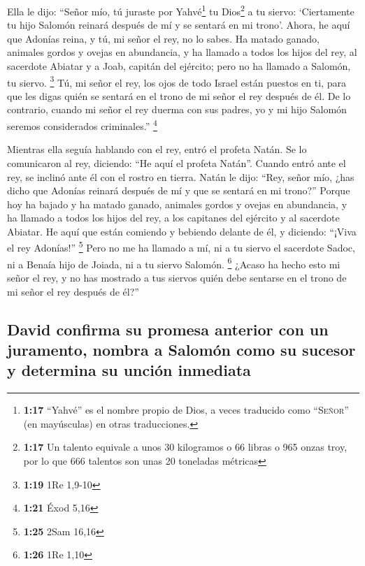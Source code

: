 \begin{paracol}{2}
 Ella le dijo: ``Señor mío, tú juraste por
Yahvé\footnote{\textbf{1:17} ``Yahvé'' es el nombre propio de Dios, a
  veces traducido como ``\textsc{Señor}'' (en mayúsculas) en otras
  traducciones.} tu Dios\footnote{\textbf{1:17} Un talento equivale a
  unos 30 kilogramos o 66 libras o 965 onzas troy, por lo que 666
  talentos son unas 20 toneladas métricas} a tu siervo: `Ciertamente tu
hijo Salomón reinará después de mí y se sentará en mi trono'.
 Ahora, he aquí que Adonías reina, y tú, mi señor el rey,
no lo sabes.  Ha matado ganado, animales gordos y ovejas
en abundancia, y ha llamado a todos los hijos del rey, al sacerdote
Abiatar y a Joab, capitán del ejército; pero no ha llamado a Salomón, tu
siervo. \footnote{\textbf{1:19} 1Re 1,9-10}  Tú, mi señor
el rey, los ojos de todo Israel están puestos en ti, para que les digas
quién se sentará en el trono de mi señor el rey después de él.
 De lo contrario, cuando mi señor el rey duerma con sus
padres, yo y mi hijo Salomón seremos considerados criminales.''
\footnote{\textbf{1:21} Éxod 5,16}

 Mientras ella seguía hablando con el rey, entró el
profeta Natán.  Se lo comunicaron al rey, diciendo: ``He
aquí el profeta Natán''. Cuando entró ante el rey, se inclinó ante él
con el rostro en tierra.  Natán le dijo: ``Rey, señor
mío, ¿has dicho que Adonías reinará después de mí y que se sentará en mi
trono?''  Porque hoy ha bajado y ha matado ganado,
animales gordos y ovejas en abundancia, y ha llamado a todos los hijos
del rey, a los capitanes del ejército y al sacerdote Abiatar. He aquí
que están comiendo y bebiendo delante de él, y diciendo: ``¡Viva el rey
Adonías!'' \footnote{\textbf{1:25} 2Sam 16,16}  Pero no
me ha llamado a mí, ni a tu siervo el sacerdote Sadoc, ni a Benaía hijo
de Joiada, ni a tu siervo Salomón. \footnote{\textbf{1:26} 1Re 1,10}
 ¿Acaso ha hecho esto mi señor el rey, y no has mostrado
a tus siervos quién debe sentarse en el trono de mi señor el rey después
de él?''

\hypertarget{david-confirma-su-promesa-anterior-con-un-juramento-nombra-a-salomuxf3n-como-su-sucesor-y-determina-su-unciuxf3n-inmediata}{%
\subsection{David confirma su promesa anterior con un juramento, nombra
a Salomón como su sucesor y determina su unción
inmediata}\label{david-confirma-su-promesa-anterior-con-un-juramento-nombra-a-salomuxf3n-como-su-sucesor-y-determina-su-unciuxf3n-inmediata}}


\end{paracol}
